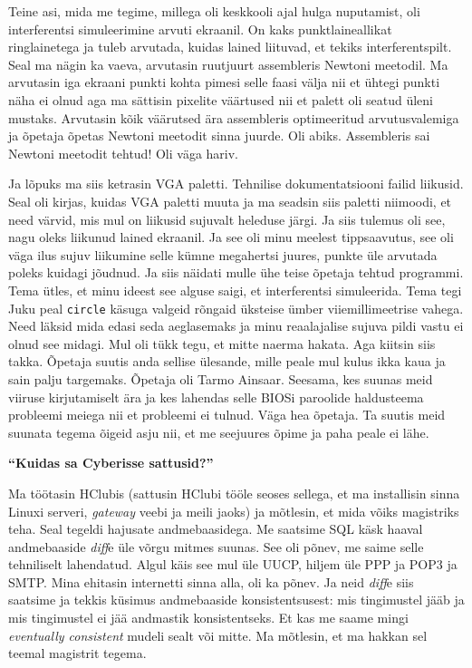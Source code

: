 Teine asi, mida me tegime, millega oli keskkooli ajal hulga nuputamist, oli interferentsi simuleerimine arvuti ekraanil. On kaks punktlaineallikat ringlainetega ja tuleb arvutada, kuidas lained liituvad, et tekiks interferentspilt. Seal ma nägin ka vaeva, arvutasin ruutjuurt assembleris Newtoni meetodil. Ma arvutasin iga ekraani punkti kohta pimesi selle faasi välja nii et ühtegi punkti näha ei olnud aga ma sättisin pixelite väärtused nii et palett oli seatud üleni mustaks. Arvutasin kõik väärutsed ära assembleris optimeeritud arvutusvalemiga ja õpetaja õpetas Newtoni meetodit sinna juurde. Oli abiks. Assembleris sai Newtoni meetodit tehtud! Oli väga hariv. 

Ja lõpuks ma siis ketrasin VGA paletti. Tehnilise dokumentatsiooni failid liikusid. Seal oli kirjas, kuidas VGA paletti muuta ja ma seadsin siis paletti niimoodi, et need värvid, mis mul on liikusid sujuvalt heleduse järgi. Ja siis tulemus oli see, nagu oleks liikunud lained ekraanil. Ja see oli minu meelest tippsaavutus, see oli väga ilus sujuv liikumine selle kümne megahertsi juures, punkte üle arvutada poleks kuidagi jõudnud. Ja siis näidati mulle ühe teise õpetaja tehtud programmi. Tema ütles, et minu ideest see alguse saigi, et interferentsi simuleerida. Tema tegi Juku peal \verb|circle| käsuga valgeid rõngaid üksteise ümber viiemillimeetrise vahega. Need läksid mida edasi seda aeglasemaks ja minu reaalajalise sujuva pildi vastu ei olnud see midagi. Mul oli tükk tegu, et mitte naerma hakata. Aga kiitsin siis takka. Õpetaja suutis anda sellise ülesande, mille peale mul kulus ikka kaua ja sain palju targemaks. Õpetaja oli Tarmo Ainsaar. Seesama, kes suunas meid viiruse kirjutamiselt ära ja kes lahendas selle BIOSi paroolide haldusteema probleemi meiega nii et probleemi ei tulnud. Väga hea õpetaja. Ta suutis meid suunata tegema õigeid asju nii, et me seejuures õpime ja paha peale ei lähe. 

\textbf{\enquote{Kuidas sa Cyberisse sattusid?}}

Ma töötasin HClubis (sattusin HClubi tööle seoses sellega, et ma installisin sinna Linuxi serveri, \emph{gateway} veebi ja meili jaoks) ja mõtlesin, et mida võiks magistriks teha. Seal tegeldi hajusate andmebaasidega. Me saatsime SQL käsk haaval andmebaaside \emph{diff}e üle võrgu mitmes suunas. See oli põnev, me saime selle tehniliselt lahendatud. Algul käis see mul üle UUCP, hiljem üle PPP ja POP3 ja SMTP. Mina ehitasin internetti sinna alla, oli ka põnev. Ja neid \emph{diff}e siis saatsime ja tekkis küsimus andmebaaside konsistentsusest: mis tingimustel jääb ja mis tingimustel ei jää andmastik konsistentseks. Et kas me saame mingi \emph{eventually consistent} mudeli sealt või mitte. Ma mõtlesin, et ma hakkan sel teemal magistrit tegema.

